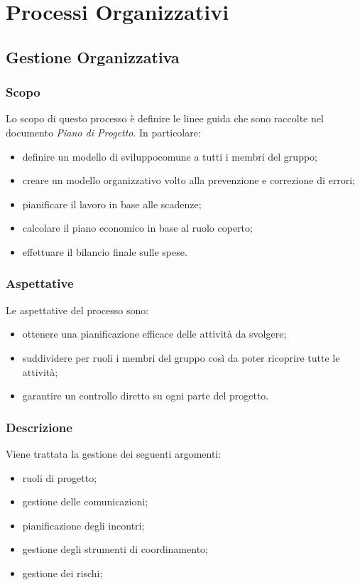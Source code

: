 \section{Processi Organizzativi}
	\subsection{Gestione Organizzativa}
		\subsubsection{Scopo}

		Lo scopo di questo processo è definire le linee guida che sono raccolte nel documento \textit{Piano di Progetto}. In particolare:
		\begin{itemize}
			\item definire un modello di sviluppo\glosp comune a tutti i membri del gruppo; 
			\item creare un modello organizzativo volto alla prevenzione e correzione di errori;
			\item pianificare il lavoro in base alle scadenze;
			\item calcolare il piano economico in base al ruolo coperto;
			\item effettuare il bilancio finale sulle spese.
		\end{itemize}

		\subsubsection{Aspettative}
		Le aspettative del processo sono:
		\begin{itemize}
			\item ottenere una pianificazione efficace delle attività da svolgere;
			\item suddividere per ruoli i membri del gruppo così da poter ricoprire tutte le attività;
			\item garantire un controllo diretto su ogni parte del progetto.
		\end{itemize}
		\subsubsection{Descrizione}
		Viene trattata la gestione dei seguenti argomenti:
		\begin{itemize}
			\item ruoli di progetto;
			\item gestione delle comunicazioni;
			\item pianificazione degli incontri;
			\item gestione degli strumenti di coordinamento;
			\item gestione dei rischi;
		\end{itemize}

